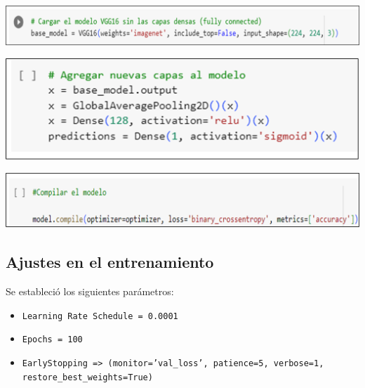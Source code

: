 \documentclass[12pt,twoside,titlepage]{ingenius}
\newenvironment{figura}
  {\par\bigskip\noindent\minipage{\linewidth}}
  {\endminipage\par\bigskip}
\begin{document}
\begin{multicols}{2}
\begin{figura}%
	\centering
	\includegraphics[scale=0.17]{figuras/fig4.png}
	\label{figura4}
\end{figura}

\begin{figura}%
	\centering
	\includegraphics[scale=0.24]{figuras/fig5.png}
	\label{figura5}
\end{figura}

\begin{figura}%
	\centering
	\includegraphics[scale=0.22]{figuras/fig6.png}
	\label{figura6}
\end{figura}


\subsection{Ajustes en el entrenamiento}
Se estableció los siguientes parámetros:
\begin{itemize}
	\item \texttt{Learning Rate Schedule = 0.0001}	
	\item \texttt{Epochs = 100}
	\item \texttt{EarlyStopping => (monitor='val\_loss', patience=5, verbose=1, \\ restore\_best\_weights=True)}
\end{itemize}


\end{multicols}
\end{document}
